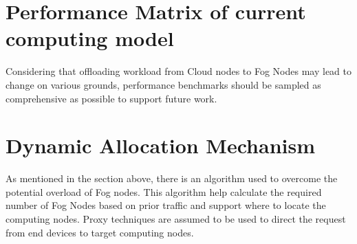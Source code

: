 \section{Performance Matrix of current computing model}
Considering that offloading workload from Cloud nodes to Fog Nodes may lead to change on various grounds, performance benchmarks should be sampled as comprehensive as possible to support future work.

\section{Dynamic Allocation Mechanism}
As mentioned in the section above, there is an algorithm used to overcome the potential overload of Fog nodes. This algorithm help calculate the required number of Fog Nodes based on prior traffic and support where to locate the computing nodes. Proxy techniques are assumed to be used to direct the request from end devices to target computing nodes.